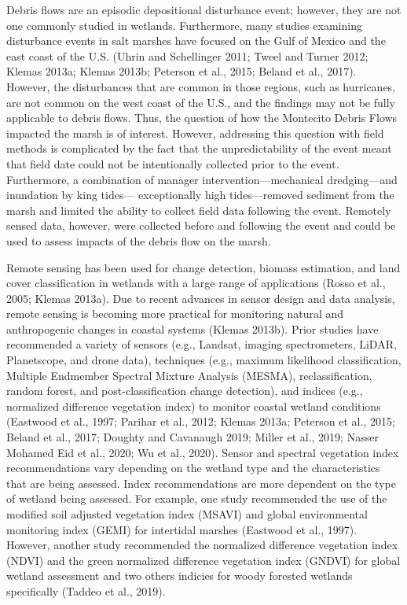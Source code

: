 \documentclass[
]{article}
\begin{document}
Debris flows are an episodic depositional disturbance event; however,
they are not one commonly studied in wetlands. Furthermore, many studies
examining disturbance events in salt marshes have focused on the Gulf of
Mexico and the east coast of the U.S. (Uhrin and Schellinger 2011; Tweel
and Turner 2012; Klemas 2013a; Klemas 2013b; Peterson et al., 2015;
Beland et al., 2017). However, the disturbances that are common in those
regions, such as hurricanes, are not common on the west coast of the
U.S., and the findings may not be fully applicable to debris flows.
Thus, the question of how the Montecito Debris Flows impacted the marsh
is of interest. However, addressing this question with field methods is
complicated by the fact that the unpredictability of the event meant
that field date could not be intentionally collected prior to the event.
Furthermore, a combination of manager intervention---mechanical
dredging---and inundation by king tides--- exceptionally high
tides---removed sediment from the marsh and limited the ability to
collect field data following the event. Remotely sensed data, however,
were collected before and following the event and could be used to
assess impacts of the debris flow on the marsh.

Remote sensing has been used for change detection, biomass estimation,
and land cover classification in wetlands with a large range of
applications (Rosso et al., 2005; Klemas 2013a). Due to recent advances
in sensor design and data analysis, remote sensing is becoming more
practical for monitoring natural and anthropogenic changes in coastal
systems (Klemas 2013b). Prior studies have recommended a variety of
sensors (e.g., Landsat, imaging spectrometers, LiDAR, Planetscope, and
drone data), techniques (e.g., maximum likelihood classification,
Multiple Endmember Spectral Mixture Analysis (MESMA), reclassification,
random forest, and post-classification change detection), and indices
(e.g., normalized difference vegetation index) to monitor coastal
wetland conditions (Eastwood et al., 1997; Parihar et al., 2012; Klemas
2013a; Peterson et al., 2015; Beland et al., 2017; Doughty and Cavanaugh
2019; Miller et al., 2019; Nasser Mohamed Eid et al., 2020; Wu et al.,
2020). Sensor and spectral vegetation index recommendations vary
depending on the wetland type and the characteristics that are being
assessed. Index recommendations are more dependent on the type of
wetland being assessed. For example, one study recommended the use of
the modified soil adjusted vegetation index (MSAVI) and global
environmental monitoring index (GEMI) for intertidal marshes (Eastwood
et al., 1997). However, another study recommended the normalized
difference vegetation index (NDVI) and the green normalized difference
vegetation index (GNDVI) for global wetland assessment and two others
indicies for woody forested wetlands specifically (Taddeo et al., 2019).
\end{document}
